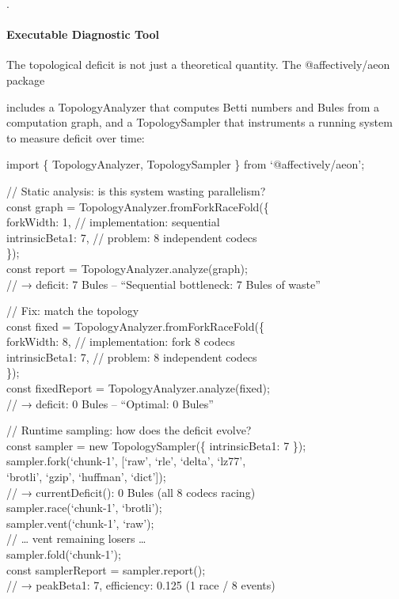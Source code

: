 \documentclass[
]{article}
\begin{document}
.

\paragraph{\texorpdfstring{\textbf{Executable Diagnostic
Tool}}{Executable Diagnostic Tool}}\label{executable-diagnostic-tool}

The topological deficit is not just a theoretical quantity. The
@affectively/aeon package

includes a TopologyAnalyzer that computes Betti numbers and Bules from a
computation graph, and a TopologySampler that instruments a running
system to measure deficit over time:

import \{ TopologyAnalyzer, TopologySampler \} from `@affectively/aeon';

// Static analysis: is this system wasting parallelism?\\
const graph = TopologyAnalyzer.fromForkRaceFold(\{\\
forkWidth: 1, // implementation: sequential\\
intrinsicBeta1: 7, // problem: 8 independent codecs\\
\});\\
const report = TopologyAnalyzer.analyze(graph);\\
// → deficit: 7 Bules -- ``Sequential bottleneck: 7 Bules of waste''

// Fix: match the topology\\
const fixed = TopologyAnalyzer.fromForkRaceFold(\{\\
forkWidth: 8, // implementation: fork 8 codecs\\
intrinsicBeta1: 7, // problem: 8 independent codecs\\
\});\\
const fixedReport = TopologyAnalyzer.analyze(fixed);\\
// → deficit: 0 Bules -- ``Optimal: 0 Bules''

// Runtime sampling: how does the deficit evolve?\\
const sampler = new TopologySampler(\{ intrinsicBeta1: 7 \});\\
sampler.fork(`chunk-1', {[}`raw', `rle', `delta', `lz77',\\
`brotli', `gzip', `huffman', `dict'{]});\\
// → currentDeficit(): 0 Bules (all 8 codecs racing)\\
sampler.race(`chunk-1', `brotli');\\
sampler.vent(`chunk-1', `raw');\\
// \ldots{} vent remaining losers \ldots{}\\
sampler.fold(`chunk-1');\\
const samplerReport = sampler.report();\\
// → peakBeta1: 7, efficiency: 0.125 (1 race / 8 events)
\end{document}
